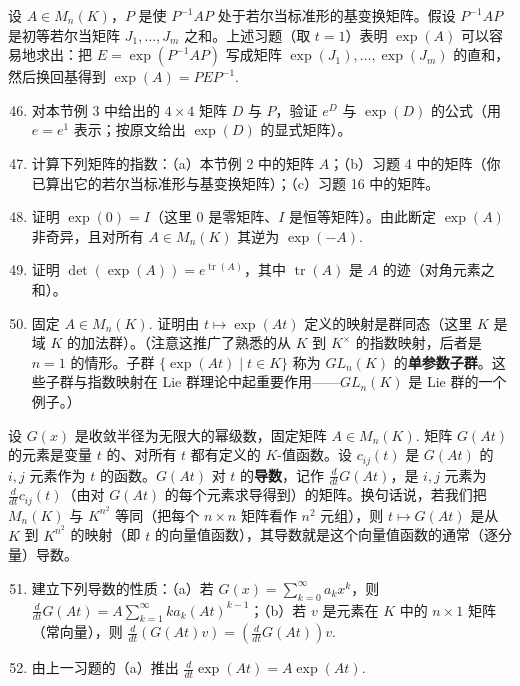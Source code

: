 \noindent 设 \(A \in M_n(K)\)，\(P\) 是使 \(P^{-1}AP\) 处于若尔当标准形的基变换矩阵。假设 \(P^{-1}AP\) 是初等若尔当矩阵 \(J_1, \ldots, J_m\) 之和。上述习题（取 \(t = 1\)）表明 \(\exp(A)\) 可以容易地求出：把 \(E = \exp(P^{-1}AP)\) 写成矩阵 \(\exp(J_1), \ldots, \exp(J_m)\) 的直和，然后换回基得到 \(\exp(A) = PEP^{-1}\).

\begin{enumerate}
\setcounter{enumi}{45}
\item 对本节例 3 中给出的 \(4 \times 4\) 矩阵 \(D\) 与 \(P\)，验证 \(e^D\) 与 \(\exp(D)\) 的公式（用 \(e = e^1\) 表示；按原文给出 \(\exp(D)\) 的显式矩阵）。

\item 计算下列矩阵的指数：（a）本节例 2 中的矩阵 \(A\)；（b）习题 4 中的矩阵（你已算出它的若尔当标准形与基变换矩阵）；（c）习题 16 中的矩阵。

\item 证明 \(\exp(0) = I\)（这里 0 是零矩阵、\(I\) 是恒等矩阵）。由此断定 \(\exp(A)\) 非奇异，且对所有 \(A \in M_n(K)\) 其逆为 \(\exp(-A)\).

\item 证明 \(\det(\exp(A)) = e^{\operatorname{tr}(A)}\)，其中 \(\operatorname{tr}(A)\) 是 \(A\) 的迹（对角元素之和）。

\item 固定 \(A \in M_n(K)\). 证明由 \(t \mapsto \exp(At)\) 定义的映射是群同态（这里 \(K\) 是域 \(K\) 的加法群）。（注意这推广了熟悉的从 \(K\) 到 \(K^\times\) 的指数映射，后者是 \(n = 1\) 的情形。子群 \(\{\exp(At) \mid t \in K\}\) 称为 \(GL_n(K)\) 的\textbf{单参数子群}。这些子群与指数映射在 Lie 群理论中起重要作用——\(GL_n(K)\) 是 Lie 群的一个例子。）
\end{enumerate}

\noindent 设 \(G(x)\) 是收敛半径为无限大的幂级数，固定矩阵 \(A \in M_n(K)\). 矩阵 \(G(At)\) 的元素是变量 \(t\) 的、对所有 \(t\) 都有定义的 \(K\)-值函数。设 \(c_{ij}(t)\) 是 \(G(At)\) 的 \(i, j\) 元素作为 \(t\) 的函数。\(G(At)\) 对 \(t\) 的\textbf{导数}，记作 \(\frac{d}{dt}G(At)\)，是 \(i, j\) 元素为 \(\frac{d}{dt}c_{ij}(t)\)（由对 \(G(At)\) 的每个元素求导得到）的矩阵。换句话说，若我们把 \(M_n(K)\) 与 \(K^{n^2}\) 等同（把每个 \(n \times n\) 矩阵看作 \(n^2\) 元组），则 \(t \mapsto G(At)\) 是从 \(K\) 到 \(K^{n^2}\) 的映射（即 \(t\) 的向量值函数），其导数就是这个向量值函数的通常（逐分量）导数。

\begin{enumerate}
\setcounter{enumi}{50}
\item 建立下列导数的性质：（a）若 \(G(x) = \sum_{k=0}^{\infty}a_kx^k\)，则 \(\frac{d}{dt}G(At) = A\sum_{k=1}^{\infty}ka_k(At)^{k-1}\)；（b）若 \(v\) 是元素在 \(K\) 中的 \(n \times 1\) 矩阵（常向量），则 \(\frac{d}{dt}(G(At)v) = \left(\frac{d}{dt}G(At)\right)v\).

\item 由上一习题的（a）推出 \(\frac{d}{dt}\exp(At) = A\exp(At)\).
\end{enumerate}

